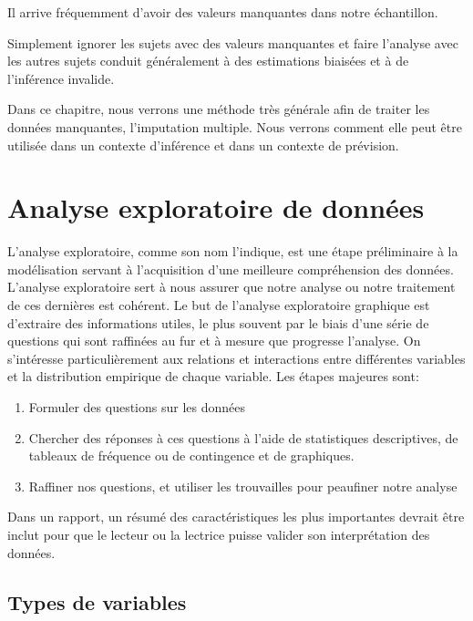 \documentclass[
  11pt,
  letterpaper,
]{book}
\providecommand{\tightlist}{%
  \setlength{\itemsep}{0pt}\setlength{\parskip}{0pt}}
\theoremstyle{definition}
\theoremstyle{definition}
\theoremstyle{definition}
\theoremstyle{remark}
\begin{document}
Il arrive fréquemment d'avoir des valeurs manquantes dans notre échantillon.

Simplement ignorer les sujets avec des valeurs manquantes et faire l'analyse avec les autres sujets conduit généralement à des estimations biaisées et à de l'inférence invalide.

Dans ce chapitre, nous verrons une méthode très générale afin de traiter les données manquantes, l'imputation multiple. Nous verrons comment elle peut être utilisée dans un contexte d'inférence et dans un contexte de prévision.

\hypertarget{analyse-exploratoire}{%
\section{Analyse exploratoire de données}\label{analyse-exploratoire}}

L'analyse exploratoire, comme son nom l'indique, est une étape préliminaire à la modélisation servant à l'acquisition d'une meilleure compréhension des données.
L'analyse exploratoire sert à nous assurer que notre analyse ou notre traitement de ces dernières est cohérent. Le but de l'analyse exploratoire graphique est d'extraire des informations utiles, le plus souvent par le biais d'une série de questions qui sont raffinées au fur et à mesure que progresse l'analyse. On s'intéresse particulièrement aux relations et interactions entre différentes variables et la distribution empirique de chaque variable. Les étapes majeures sont:

\begin{enumerate}
\def\labelenumi{\arabic{enumi}.}
\tightlist
\item
  Formuler des questions sur les données
\item
  Chercher des réponses à ces questions à l'aide de statistiques descriptives, de tableaux de fréquence ou de contingence et de graphiques.
\item
  Raffiner nos questions, et utiliser les trouvailles pour peaufiner notre analyse
\end{enumerate}

Dans un rapport, un résumé des caractéristiques les plus importantes devrait être inclut pour que le lecteur ou la lectrice puisse valider son interprétation des données.

\hypertarget{types-de-variables}{%
\subsection{Types de variables}\label{types-de-variables}}
\end{document}
